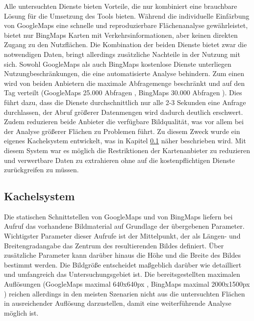 Alle untersuchten Dienste bieten Vorteile, die nur kombiniert eine brauchbare Lösung für die Umsetzung des Tools bieten. Während die individuelle Einfärbung von GoogleMaps eine schnelle und reproduzierbare Flächenanalyse gewährleistet, bietet nur BingMaps Karten mit Verkehrsinformationen, aber keinen direkten Zugang zu den Nutzflächen. Die Kombination der beiden Dienste bietet zwar die notwendigen Daten, bringt allerdings zusätzliche Nachteile in der Nutzung mit sich. Sowohl GoogleMaps als auch BingMaps kostenlose Dienste unterliegen Nutzungbeschränkungen, die eine automatisierte Analyse behindern. Zum einen wird von beiden Anbietern die maximale Abfragemenge beschränkt und auf den Tag verteilt (GoogleMaps 25.000 Abfragen \cite{googleusagelimits}, BingMaps 30.000 Abfragen \cite{bingusagelimits}). Dies führt dazu, dass die Dienste durchschnittlich nur alle 2-3 Sekunden eine Anfrage durchlassen, der Abruf größerer Datenmengen wird dadurch deutlich erschwert. Zudem reduzieren beide Anbieter die verfügbare Bildqualität, was vor allem bei der Analyse größerer Flächen zu Problemen führt. Zu diesem Zweck wurde ein eigenes Kachelsystem entwickelt, was in Kapitel \ref{sec:kachelsystem} näher beschrieben wird. Mit diesem System war es möglich die Restriktionen der Kartenanbieter zu reduzieren und verwertbare Daten zu extrahieren ohne auf die kostenpflichtigen Dienste zurückgreifen zu müssen.\\

\subsection{Kachelsystem}
\label{sec:kachelsystem}

Die statischen Schnittstellen von GoogleMaps und von BingMaps liefern bei Aufruf das vorhandene Bildmaterial auf Grundlage der übergebenen Parameter. Wichtigster Parameter dieser Aufrufe ist der Mittelpunkt, der als Längen- und Breitengradangabe das Zentrum des resultierenden Bildes definiert. Über zusätzliche Parameter kann darüber hinaus die Höhe und die Breite des Bildes bestimmt werden. Die Bildgröße entscheidet maßgeblich darüber wie detailliert und umfangreich das Untersuchungsgebiet ist. Die bereitsgestellten maximalen Auflösungen (GoogleMaps maximal 640x640px \cite{googleusagelimits}, BingMaps maximal 2000x1500px \cite{bingstaticmap}) reichen allerdings in den meisten Szenarien nicht aus die untersuchten Flächen in ausreichender Auflösung darzustellen, damit eine weiterführende Analyse möglich ist.\\

